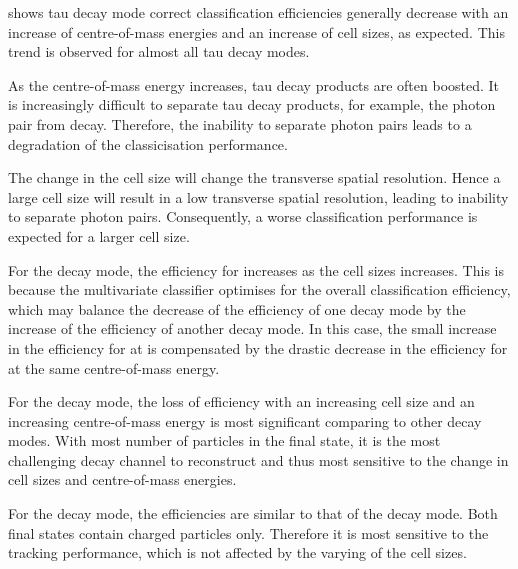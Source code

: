  shows tau decay mode correct classification efficiencies generally decrease with an increase of centre-of-mass energies and an increase of \ECAL cell sizes, as expected. This trend is observed for almost all tau decay modes.

As the centre-of-mass energy increases, tau decay products are often boosted. It is increasingly difficult to separate tau decay products, for example, the photon pair from \Ppizero decay. Therefore, the inability to separate photon pairs leads to a degradation of  the classicisation performance.

The change in the \ECAL cell size will change the transverse spatial resolution. Hence a large cell size will result in a low transverse spatial resolution, leading to inability to separate photon pairs. Consequently, a worse classification performance is expected for a larger \ECAL cell size.




For the \decayRhoShort decay mode, the efficiency for   increases as the cell sizes increases. This is because the multivariate classifier optimises for the overall classification efficiency, which may balance the decrease of the efficiency of one decay mode by the increase of the efficiency of another decay mode. In this case, the small increase in the efficiency for \decayRhoShort at  is compensated by the drastic decrease in the efficiency for \decayAiPhotonShort at the same centre-of-mass energy.

For the \decayAiPhotonShort decay mode, the loss of efficiency with an increasing \ECAL  cell size and an increasing centre-of-mass energy is most significant comparing to other decay modes. With most number of particles in the final state, it is the most challenging decay channel to reconstruct and thus most sensitive to the change in cell sizes and centre-of-mass energies.

For the \decayAiPionShort decay mode, the efficiencies are similar to that of the \decayPionShort decay mode. Both final states contain charged particles only. Therefore it is most sensitive to the tracking performance, which is not affected by the  varying of the \ECAL cell sizes.


